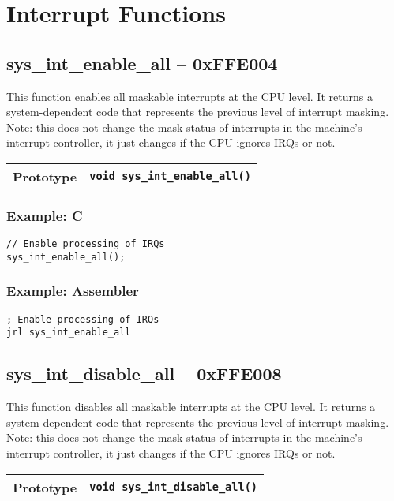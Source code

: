 \section{Interrupt Functions}

\subsection*{sys\_int\_enable\_all -- 0xFFE004}
This function enables all maskable interrupts at the CPU level. It returns a system-dependent code that represents the previous level of interrupt masking. Note: this does not change the mask status of interrupts in the machine's interrupt controller, it just changes if the CPU ignores IRQs or not.

\bigskip

\begin{tabular}{|l||l|} \hline
Prototype & \lstinline!void sys_int_enable_all()! \\ \hline
\end{tabular}

\subsubsection*{Example: C}
\begin{lstlisting}
// Enable processing of IRQs
sys_int_enable_all();
\end{lstlisting}

\subsubsection*{Example: Assembler}
\begin{verbatim}
; Enable processing of IRQs
jrl sys_int_enable_all
\end{verbatim}

\subsection*{sys\_int\_disable\_all -- 0xFFE008}
This function disables all maskable interrupts at the CPU level. It returns a system-dependent code that represents the previous level of interrupt masking. Note: this does not change the mask status of interrupts in the machine's interrupt controller, it just changes if the CPU ignores IRQs or not.

\bigskip

\begin{tabular}{|l||l|} \hline
Prototype & \lstinline!void sys_int_disable_all()! \\ \hline
\end{tabular}

